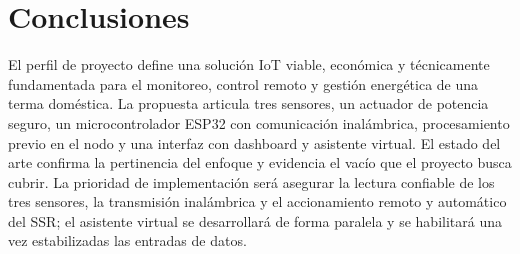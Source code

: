 \documentclass[11pt,a4paper]{article}
\begin{document}
\section*{Conclusiones}
El perfil de proyecto define una solución IoT viable, económica y técnicamente fundamentada para el monitoreo, control remoto y gestión energética de una terma doméstica. La propuesta articula tres sensores, un actuador de potencia seguro, un microcontrolador ESP32 con comunicación inalámbrica, procesamiento previo en el nodo y una interfaz con dashboard y asistente virtual. El estado del arte confirma la pertinencia del enfoque y evidencia el vacío que el proyecto busca cubrir. La prioridad de implementación será asegurar la lectura confiable de los tres sensores, la transmisión inalámbrica y el accionamiento remoto y automático del SSR; el asistente virtual se desarrollará de forma paralela y se habilitará una vez estabilizadas las entradas de datos.

\clearpage
\end{document}
